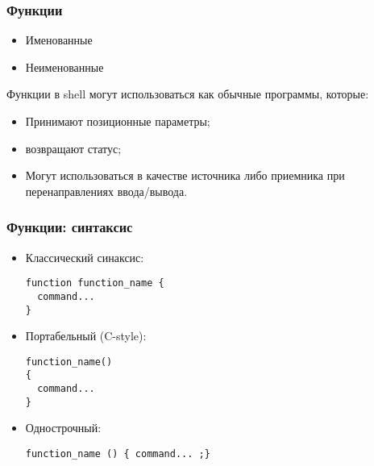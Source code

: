 \begin{frame}
	\frametitle{Функции}

	\begin{itemize}
		\item Именованные
		\item Неименованные
	\end{itemize}

	Функции в shell могут использоваться как обычные программы, которые:
	\begin{itemize}
		\item Принимают позиционные параметры;
		\item возвращают статус;
		\item Могут использоваться в качестве источника либо приемника 
			при перенаправлениях ввода/вывода.
	\end{itemize}

\end{frame}


\begin{frame}[fragile]
	\frametitle{Функции: синтаксис}
	\begin{itemize}
		\item Классический синаксис: 
			\begin{lstlisting}
function function_name {
  command...
}
\end{lstlisting}
		\item Портабельный (C-style):
			\begin{lstlisting}
function_name()
{
  command...
} 
\end{lstlisting}

		\item Однострочный:
			\begin{lstlisting}
function_name () { command... ;}
\end{lstlisting}
  \end{itemize}
\end{frame}

